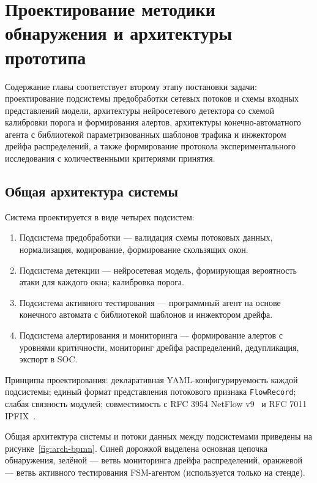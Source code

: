 \section{Проектирование методики обнаружения и архитектуры прототипа}
\label{ch:design}

\noindent
Содержание главы соответствует второму этапу постановки задачи:
проектирование подсистемы предобработки сетевых потоков и схемы
входных представлений модели, архитектуры нейросетевого детектора
со схемой калибровки порога и формирования алертов, архитектуры
конечно-автоматного агента с библиотекой параметризованных шаблонов
трафика и инжектором дрейфа распределений, а также формирование
протокола экспериментального исследования с количественными
критериями принятия.

\subsection{Общая архитектура системы}

Система проектируется в виде четырех подсистем:

\begin{enumerate}
    \item Подсистема предобработки --- валидация схемы потоковых
    данных, нормализация, кодирование, формирование скользящих окон.
    \item Подсистема детекции --- нейросетевая модель, формирующая
    вероятность атаки для каждого окна; калибровка порога.
    \item Подсистема активного тестирования --- программный агент
    на основе конечного автомата с библиотекой шаблонов и
    инжектором дрейфа.
    \item Подсистема алертирования и мониторинга --- формирование
    алертов с уровнями критичности, мониторинг дрейфа распределений,
    дедупликация, экспорт в SOC.
\end{enumerate}

Принципы проектирования: декларативная YAML-конфигурируемость
каждой подсистемы; единый формат представления потокового признака
\texttt{FlowRecord}; слабая связность модулей; совместимость с
RFC 3954 NetFlow v9~\cite{rfc3954} и RFC 7011 IPFIX~\cite{rfc7011}.

Общая архитектура системы и потоки данных между подсистемами
приведены на рисунке~\ref{fig:arch-bpmn}. Синей дорожкой выделена
основная цепочка обнаружения, зелёной --- ветвь мониторинга
дрейфа распределений, оранжевой --- ветвь активного тестирования
FSM-агентом (используется только на стенде).

